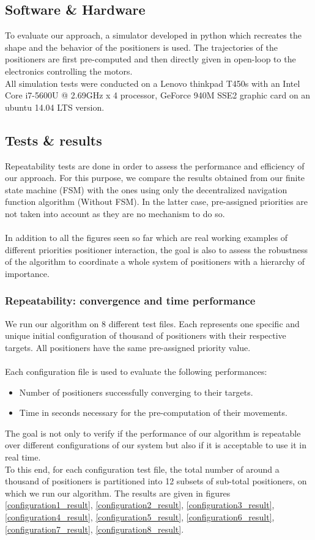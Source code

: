 \documentclass[]{spie}  %
\begin{document}
	\subsection{Software \& Hardware}
	\label{Software Hardware}
	To evaluate our approach, a simulator developed in python which recreates the shape and the behavior of the positioners is used. The trajectories of the positioners are first pre-computed and then directly given in open-loop to the electronics controlling the motors.\\  
	All simulation tests were conducted on a Lenovo thinkpad T450s with an Intel Core i7-5600U @ 2.69GHz x 4 processor, GeForce 940M SSE2 graphic card on an ubuntu 14.04 LTS version.
	\subsection{Tests \& results}
	\label{Test cases}
	
	Repeatability tests are done in order to assess the performance and efficiency of our approach. For this purpose, we compare the results obtained from our finite state machine (FSM) with the ones using only the decentralized navigation function algorithm (Without FSM). In the latter case, pre-assigned priorities are not taken into account as they are no mechanism to do so.\\\\
	In addition to all the figures seen so far which are real working examples of different priorities positioner interaction, the goal is also to assess the robustness of the algorithm to coordinate a whole system of positioners with a hierarchy of importance.
	
	\subsubsection{Repeatability: convergence and time performance}
	We run our algorithm on 8 different test files. Each represents one specific and unique initial configuration of thousand of positioners with their respective targets. All positioners have the same pre-assigned priority value.\\\\
	Each configuration file is used to evaluate the following performances: 
	\begin{itemize}
		\item Number of positioners successfully converging to their targets.
		\item Time in seconds necessary for the pre-computation of their movements.
	\end{itemize}
	The goal is not only to verify if the performance of our algorithm is repeatable over different configurations of our system but also if it is acceptable to use it in real time.\\
	To this end, for each configuration test file, the total number of around a thousand of positioners is partitioned into 12 subsets of sub-total positioners, on which we run our algorithm. The results are given in figures \ref{configuration1_result}, \ref{configuration2_result}, \ref{configuration3_result}, \ref{configuration4_result}, \ref{configuration5_result}, \ref{configuration6_result}, \ref{configuration7_result}, \ref{configuration8_result}.
	
\end{document}
